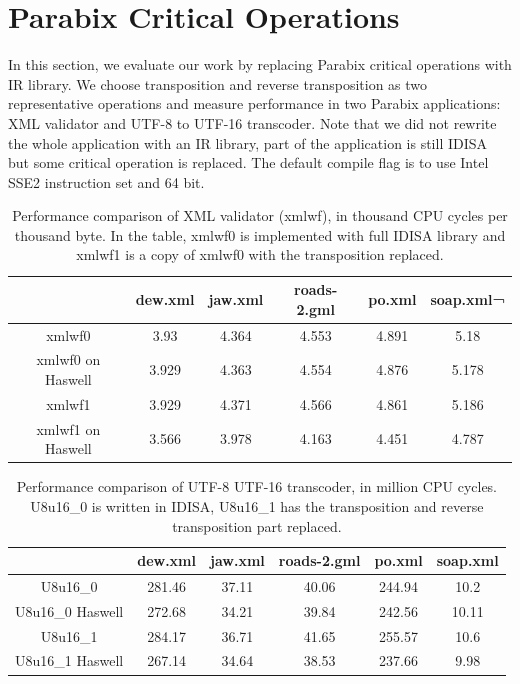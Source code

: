 \section{Parabix Critical Operations}
In this section, we evaluate our work by replacing Parabix critical operations with IR library. We choose transposition and reverse transposition as two representative operations and measure performance in two Parabix applications: XML validator and UTF-8 to UTF-16 transcoder. Note that we did not rewrite the whole application with an IR library, part of the application is still IDISA but some critical operation is replaced. The default compile flag is to use Intel SSE2 instruction set and 64 bit.

\begin{table}[h]
\centering
\begin{tabular}{|c|c|c|c|c|c|}
\hline
        & dew.xml  &  jaw.xml  &  roads-2.gml  &  po.xml  & soap.xml¬ \\\hline
xmlwf0   &  3.93   &    4.364   &   4.553   &   4.891   &   5.18 \\ \hline
xmlwf0 on Haswell   &  3.929   &   4.363   &   4.554   &   4.876   &   5.178 \\ \hline

xmlwf1   &  3.929   &   4.371   &   4.566   &   4.861   &   5.186 \\ \hline
xmlwf1 on Haswell &   3.566   &   3.978   &   4.163   &   4.451   &   4.787 \\ \hline
\end{tabular}
\caption[Performance Comparison of XML Validator (xmlwf)]{Performance comparison of XML validator (xmlwf), in thousand CPU cycles per thousand byte. In the table, xmlwf0 is implemented with full IDISA library and xmlwf1 is a copy of xmlwf0 with the transposition replaced.}
\label{table:xmlwf_perf}
\end{table}

\begin{table}[h]
\centering
\begin{tabular}{|c|c|c|c|c|c|}
\hline
 & dew.xml & jaw.xml & roads-2.gml & po.xml & soap.xml \\ \hline
 U8u16\_0         & 281.46  & 37.11   & 40.06       & 244.94 & 10.2     \\ \hline
 U8u16\_0 Haswell & 272.68  & 34.21   & 39.84       & 242.56 & 10.11    \\ \hline
 U8u16\_1         & 284.17  & 36.71   & 41.65       & 255.57 & 10.6     \\ \hline
 U8u16\_1 Haswell & 267.14  & 34.64   & 38.53       & 237.66 & 9.98     \\ \hline
 \end{tabular}
 \caption[Performance Comparison of UTF-8 UTF-16 Transcoder]{Performance comparison of UTF-8 UTF-16 transcoder, in million CPU cycles. U8u16\_0 is written in IDISA, U8u16\_1 has the transposition and reverse transposition part replaced.}
 \label{table:u8u16_perf}
 \end{table}

